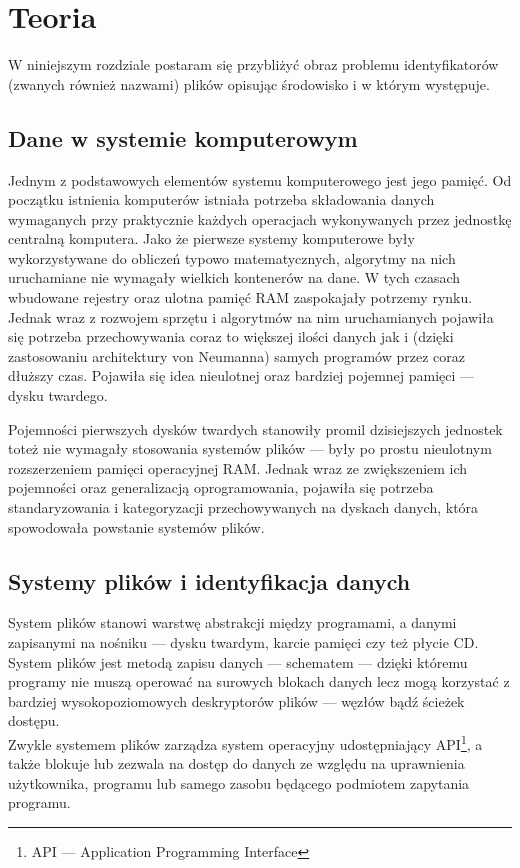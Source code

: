 \chapter{Teoria}
\label{teoria}
\par
W niniejszym rozdziale postaram się przybliżyć obraz problemu identyfikatorów (zwanych również nazwami) plików opisując środowisko i w którym występuje.

\section{Dane w systemie komputerowym}
\par
Jednym z podstawowych elementów systemu komputerowego jest jego pamięć. Od początku istnienia komputerów istniała potrzeba składowania danych wymaganych przy praktycznie każdych operacjach wykonywanych przez jednostkę centralną komputera. Jako że pierwsze systemy komputerowe były wykorzystywane do obliczeń typowo matematycznych, algorytmy na nich uruchamiane nie wymagały wielkich kontenerów na dane. W tych czasach wbudowane rejestry oraz ulotna pamięć RAM zaspokajały potrzemy rynku. Jednak wraz z rozwojem sprzętu i algorytmów na nim uruchamianych pojawiła się potrzeba przechowywania coraz to większej ilości danych jak i (dzięki zastosowaniu architektury von Neumanna) samych programów przez coraz dłuższy czas. Pojawiła się idea nieulotnej oraz bardziej pojemnej pamięci --- dysku twardego.\\

\par
Pojemności pierwszych dysków twardych stanowiły promil dzisiejszych jednostek toteż nie wymagały stosowania systemów plików --- były po prostu nieulotnym rozszerzeniem pamięci operacyjnej RAM. Jednak wraz ze zwiększeniem ich pojemności oraz generalizacją oprogramowania, pojawiła się potrzeba standaryzowania i kategoryzacji przechowywanych na dyskach danych, która spowodowała powstanie systemów plików.

\section{Systemy plików i identyfikacja danych}
\par
System plików stanowi warstwę abstrakcji między programami, a danymi zapisanymi na nośniku --- dysku twardym, karcie pamięci czy też płycie CD. System plików jest metodą zapisu danych --- schematem --- dzięki któremu programy nie muszą operować na surowych blokach danych lecz mogą korzystać z bardziej wysokopoziomowych deskryptorów plików --- węzłów bądź ścieżek dostępu.\\
Zwykle systemem plików zarządza system operacyjny udostępniający API\footnote{API --- Application Programming Interface}, a także blokuje lub zezwala na dostęp do danych ze względu na uprawnienia użytkownika, programu lub samego zasobu będącego podmiotem zapytania programu.\\

